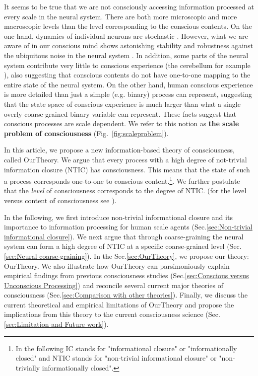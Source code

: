 \documentclass[utf8]{article}
\begin{document}
		It seems to be true that we are not consciously accessing information processed at every scale in the neural system. There are both more microscopic and more macroscopic levels than the level corresponding to the conscious contents. On the one hand, dynamics of individual neurons are stochastic \citep{Goldwyn2011, White2000}. However, what we are aware of in our conscious mind shows astonishing stability and robustness against the ubiquitous noise in the neural system \citep{mathis1995computational}. In addition, some parts of the neural system contribute very little to conscious experience (the cerebellum for example \citep{lemon2010life}), also suggesting that conscious contents do not have one-to-one mapping to the entire state of the neural system. On the other hand, human conscious experience is more detailed than just a simple (e.g. binary) process can represent, suggesting that the state space of conscious experience is much larger than what a single overly coarse-grained binary variable can represent. These facts suggest that conscious processes are scale dependent. We refer to this notion as \textbf{the scale problem of consciousness} (Fig.~\ref{fig:scaleproblem}).

		In this article, we propose a new information-based theory of consciousness, called \ac{OurTheory}. We argue that every process with a high degree of not-trivial information closure (NTIC) has consciousness. This means that the state of such a process corresponds one-to-one to conscious content.\footnote{In the following IC stands for "informational closure" or "informationally closed" and NTIC stands for "non-trivial informational closure" or "non-trivially informationally closed".}. We further postulate that the \textit{level} of consciousness corresponds to the degree of NTIC. (for the level versus content of consciousness see \cite{laureys2005neural, overgaard2010neural}).
		
		In the following, we first introduce non-trivial informational closure and its importance to information processing for human scale agents (Sec.\ref{sec:Non-trivial informational closure}). We next argue that through coarse-graining the neural system can form a high degree of NTIC at a specific coarse-grained level (Sec.\ref{sec:Neural coarse-graining}). In the Sec.\ref{sec:OurTheory}, we propose our theory: \acf{OurTheory}. We also illustrate how \ac{OurTheory} can parsimoniously explain empirical findings from previous consciousness studies (Sec.\ref{sec:Conscious versus Unconscious Processing}) and reconcile several current major theories of consciousness (Sec.\ref{sec:Comparison with other theories}). Finally, we discuss the current theoretical and empirical limitations of \ac{OurTheory} and propose the implications from this theory to the current consciousness science (Sec.\ref{sec:Limitation and Future work}). 
\end{document}

